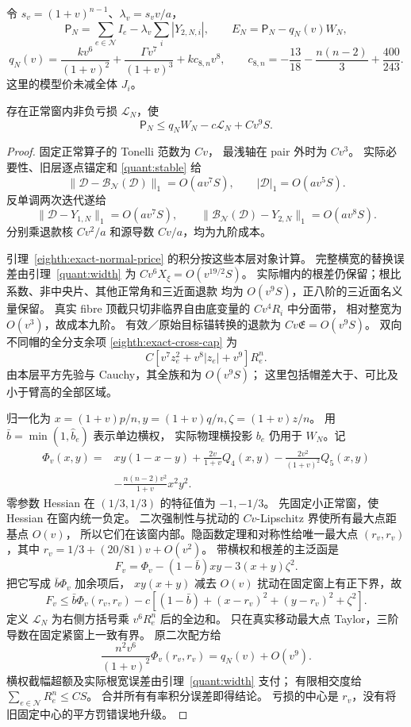 令 \(s_v=(1+v)^{n-1}\)、\(\lambda_v=s_vv/a\)，
\[
 \mathsf P_N=\sum_{e\in\mathcal N}I_e-\lambda_v\sum_i|Y_{2,N,i}|,\qquad
 E_N=\mathsf P_N-q_N(v)W_N,
\]
\[
 q_N(v)=\frac{kv^6}{(1+v)^2}
       +\frac{\Gamma v^7}{(1+v)^3}+kc_{8,n}v^8,\qquad
 c_{8,n}=-\frac{13}{18}-\frac{n(n-2)}3+\frac{400}{243}.
\]
这里的模型价未减全体 \(J_i\)。

\begin{lemma}[移动最大点的正常价格]\label{quant:normal}
存在正常窗内非负亏损 \(\mathcal L_N\)，使
\[
 \mathsf P_N\le q_NW_N-c\mathcal L_N+Cv^9S.
\]
\end{lemma}
\begin{proof}
固定正常算子的 Tonelli 范数为 \(Cv\)，
最浅轴在 pair 外时为 \(Cv^3\)。
实际必要性、旧层逐点锚定和 \eqref{quant:stable} 给
\[
 \|\mathscr D-\mathscr B_{\mathcal N}(\mathscr D)\|_1=O(av^7S),
 \qquad|\mathscr D|_1=O(av^5S).
\]
反单调两次迭代遂给
\[
 \|\mathscr D-Y_{1,N}\|_1=O(av^7S),\qquad
 \|\mathscr B_{\mathcal N}(\mathscr D)-Y_{2,N}\|_1=O(av^8S).
\]
分别乘退款核 \(Cv^2/a\) 和源导数 \(Cv/a\)，均为九阶成本。

引理~\ref{eighth:exact-normal-price} 的积分按这些本层对象计算。
完整横宽的替换误差由引理~\ref{quant:width} 为
\(Cv^6X_\xi=O(v^{19/2}S)\)。
实际帽内的根差仍保留；根比系数、非中央片、其他正常角和三近面退款
均为 \(O(v^9S)\)，正八阶的三近面名义量保留。
真实 fibre 顶截只切非临界自由底变量的 \(Cv^4R_i\) 中分面带，
相对整宽为 \(O(v^3)\)，故成本九阶。
有效／原始目标锚转换的退款为 \(Cv\mathfrak E=O(v^9S)\)。
双向不同帽的全分支余项 \eqref{eighth:exact-cross-cap} 为
\[
 C[v^7z_e^2+v^8|z_e|+v^9]R_e^n.
\]
由本层平方先验与 Cauchy，其全族和为 \(O(v^9S)\)；
这里包括帽差大于、可比及小于臂高的全部区域。

归一化为 \(x=(1+v)p/n,y=(1+v)q/n,\zeta=(1+v)z/n\)。
用 \(\bar b=\min(1,\widehat b_e)\) 表示单边横权，
实际物理横投影 \(b_e\) 仍用于 \(W_N\)。记
\[
 \begin{aligned}
 \Phi_v(x,y)={}&xy(1-x-y)+\frac{2v}{1+v}Q_4(x,y)
 -\frac{2v^2}{(1+v)^2}Q_5(x,y)\\
 &-\frac{n(n-2)v^2}{1+v}x^2y^2.
 \end{aligned}
\]
零参数 Hessian 在 \((1/3,1/3)\) 的特征值为 \(-1,-1/3\)。
先固定小正常窗，使 Hessian 在窗内统一负定。
二次强制性与扰动的 \(Cv\)-Lipschitz 界使所有最大点距基点 \(O(v)\)，
所以它们在该窗内部。隐函数定理和对称性给唯一最大点
\((r_v,r_v)\)，其中 \(r_v=1/3+(20/81)v+O(v^2)\)。
带横权和根差的主泛函是
\[
 F_v=\Phi_v-(1-\bar b)xy-3(x+y)\zeta^2.
\]
把它写成 \(\bar b\Phi_v\) 加余项后，
\(xy(x+y)\) 减去 \(O(v)\) 扰动在固定窗上有正下界，故
\[
 F_v\le\bar b\Phi_v(r_v,r_v)
 -c[(1-\bar b)+(x-r_v)^2+(y-r_v)^2+\zeta^2].
\]
定义 \(\mathcal L_N\) 为右侧方括号乘 \(v^6R_e^n\) 后的全边和。
只在真实移动最大点 Taylor，三阶导数在固定紧窗上一致有界。
原二次配方给
\[
 \frac{n^2v^6}{(1+v)^2}\Phi_v(r_v,r_v)=q_N(v)+O(v^9).
\]
横权截幅超额及实际根宽误差由引理~\ref{quant:width} 支付；
有限相交度给 \(\sum_{e\in\mathcal N}R_e^n\le CS\)。
合并所有有率积分误差即得结论。
亏损的中心是 \(r_v\)，没有将旧固定中心的平方罚错误地升级。
\end{proof}

